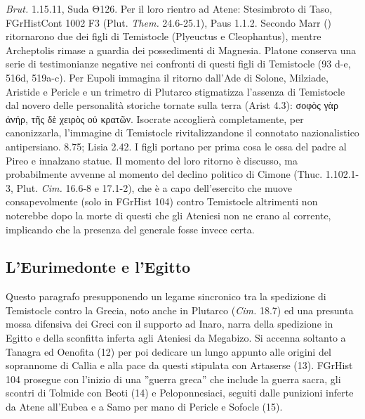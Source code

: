{\emph{Brut.} 1.15.11, Suda \textgreek{Θ}126. Per il loro rientro ad Atene: Stesimbroto di Taso, FGrHistCont 1002 F3 (Plut. \emph{Them.}  24.6-25.1), Paus 1.1.2. Secondo Marr (\cite[161]{Marr1995}) ritornarono due dei figli di Temistocle (Plyeuctus e Cleophantus), mentre Archeptolis rimase a guardia dei possedimenti di Magnesia. Platone conserva una serie di testimonianze negative nei confronti di questi figli di Temistocle (93 d-e, 516d, 519a-c). Per \cite[296-8]{Montana2002} Eupoli immagina il ritorno dall'Ade di Solone, Milziade, Aristide e Pericle  e un trimetro di Plutarco stigmatizza l'assenza di Temistocle dal novero delle personalità storiche tornate sulla terra (Arist 4.3): \textgreek{σοφὸς γὰρ ἁνήρ, τῆς δὲ χειρὸς οὐ κρατῶν}. Isocrate accoglierà completamente, per canonizzarla, l'immagine di Temistocle rivitalizzandone il connotato nazionalistico antipersiano. 8.75; Lisia 2.42. I figli portano per prima cosa le ossa del padre al Pireo e innalzano statue. Il momento del loro ritorno è discusso, ma probabilmente avvenne al momento del declino politico di  Cimone (Thuc. 1.102.1-3, Plut. \emph{Cim.} 16.6-8 e 17.1-2), che è a capo dell'esercito che muove consapevolmente (solo in FGrHist 104) contro Temistocle altrimenti non noterebbe dopo la morte di questi che gli Ateniesi non ne erano al corrente, implicando che la presenza del generale fosse invece certa.
            \subsection*{L'Eurimedonte e l'Egitto}
            Questo paragrafo presupponendo un legame sincronico tra la spedizione di Temistocle contro la Grecia, noto anche in Plutarco (\emph{Cim.} 18.7) ed una presunta mossa difensiva dei Greci con il supporto ad Inaro, narra della spedizione in Egitto e della sconfitta inferta agli Ateniesi da Megabizo. Si accenna soltanto a Tanagra ed Oenofita (12) per poi dedicare un lungo appunto alle origini del soprannome di Callia e alla pace da questi stipulata con Artaserse  (13). FGrHist 104 prosegue con l'inizio di una ''guerra greca'' che include la guerra sacra, gli scontri di  Tolmide con Beoti (14) e Peloponnesiaci, seguiti dalle punizioni inferte da Atene all'Eubea e a Samo per mano di Pericle  e Sofocle (15).
}
